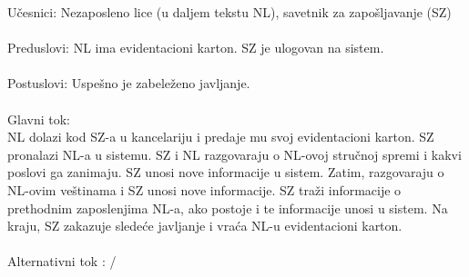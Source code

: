 \noindent U\v cesnici: Nezaposleno lice (u daljem tekstu NL), savetnik za zapo\v sljavanje (SZ)
\\
\\ Preduslovi: NL ima evidentacioni karton. SZ je ulogovan na sistem. 
\\
\\ Postuslovi: Uspe\v sno je zabele\v zeno javljanje.
\\ 
\\ Glavni tok:
\\ NL dolazi kod SZ-a u kancelariju i predaje mu svoj evidentacioni karton. SZ pronalazi NL-a u sistemu. SZ i NL razgovaraju o NL-ovoj stru\v cnoj spremi i kakvi poslovi ga zanimaju. SZ unosi nove informacije u sistem. Zatim, razgovaraju o NL-ovim ve\v stinama i SZ unosi nove informacije. SZ tra\v zi informacije o prethodnim zaposlenjima NL-a, ako postoje i te informacije unosi u sistem. Na kraju, SZ zakazuje slede\' ce javljanje i vra\' ca NL-u evidentacioni karton.
\\
\\ Alternativni tok : /
